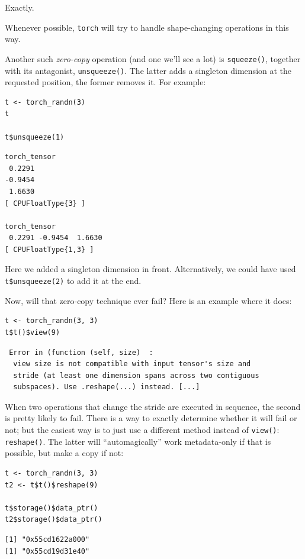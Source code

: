 \documentclass[
  letterpaper,
]{krantz}
\begin{document}
Exactly.

Whenever possible, \texttt{torch} will try to handle shape-changing
operations in this way.

Another such \emph{zero-copy} operation (and one we'll see a lot) is
\texttt{squeeze()}, together with its antagonist, \texttt{unsqueeze()}.
The latter adds a singleton dimension at the requested position, the
former removes it. For example:

\begin{verbatim}
t <- torch_randn(3)
t

t$unsqueeze(1)
\end{verbatim}

\begin{verbatim}
torch_tensor
 0.2291
-0.9454
 1.6630
[ CPUFloatType{3} ]

torch_tensor
 0.2291 -0.9454  1.6630
[ CPUFloatType{1,3} ]
\end{verbatim}

Here we added a singleton dimension in front. Alternatively, we could
have used \texttt{t\$unsqueeze(2)} to add it at the end.

Now, will that zero-copy technique ever fail? Here is an example where
it does:

\begin{verbatim}
t <- torch_randn(3, 3)
t$t()$view(9)
\end{verbatim}

\begin{verbatim}
 Error in (function (self, size)  : 
  view size is not compatible with input tensor's size and
  stride (at least one dimension spans across two contiguous
  subspaces). Use .reshape(...) instead. [...]
\end{verbatim}

When two operations that change the stride are executed in sequence, the
second is pretty likely to fail. There is a way to exactly determine
whether it will fail or not; but the easiest way is to just use a
different method instead of \texttt{view()}: \texttt{reshape()}. The
latter will ``automagically'' work metadata-only if that is possible,
but make a copy if not:

\begin{verbatim}
t <- torch_randn(3, 3)
t2 <- t$t()$reshape(9)

t$storage()$data_ptr()
t2$storage()$data_ptr()
\end{verbatim}

\begin{verbatim}
[1] "0x55cd1622a000"
[1] "0x55cd19d31e40"
\end{verbatim}
\end{document}
